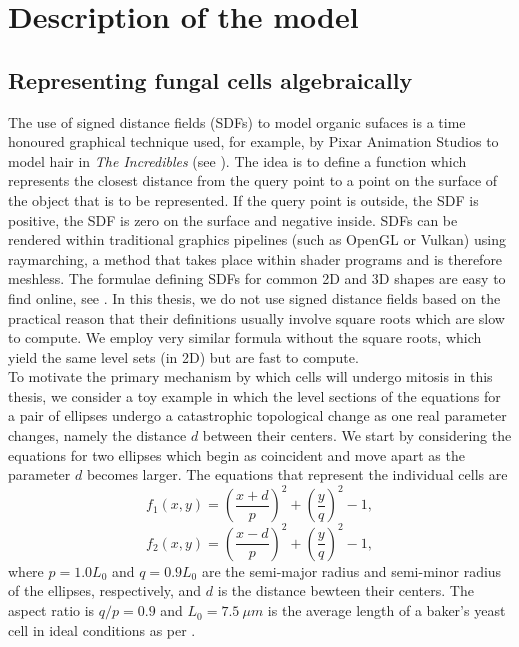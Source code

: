 \chapter{ Description of the model \label{ch:numero_uno}}
\section{Representing fungal cells algebraically}\label{sec:introSDFs}
The use of signed distance fields (SDFs) to model organic sufaces
is a time honoured graphical technique used, for example, by Pixar
Animation Studios to model hair in \textit{The Incredibles} 
(see \cite{petrovic2005volumetric}). The idea is to define a 
function which represents the closest distance from the query point
to a point on the surface of the object that is to be represented. 
If the query point is outside, the SDF is positive,
the SDF is zero on the surface and negative inside. SDFs can be 
rendered within traditional graphics pipelines (such as OpenGL or Vulkan)
using raymarching, a method that takes place within shader programs and 
is therefore meshless. The formulae defining SDFs for common 2D and 3D 
shapes are easy to find online, see \cite{key}. In this thesis,
we do not use signed distance fields based on the practical 
reason that their definitions usually involve square roots
which are slow to compute. We employ very similar formula
without the square roots, which yield the same level sets (in 2D)
but are fast to compute.
\\

To motivate the primary mechanism by which cells will undergo mitosis 
in this thesis, we consider a toy example in which the level sections of the equations for
a pair of ellipses undergo a catastrophic topological change as one real parameter 
changes, namely the distance $d$ between their centers. We start by considering 
the equations for two ellipses which 
begin as coincident and move apart as the parameter $d$ becomes larger. 
The equations that represent the individual cells are
\begin{equation*}
    f_1(x,y) = \left( \frac{x+d}{p} \right)^2 + \left( \frac{y}{q} \right)^2 - 1,
\end{equation*}
\begin{equation*}
    f_2(x,y) = \left( \frac{x-d}{p} \right)^2 + \left( \frac{y}{q} \right)^2 - 1,
\end{equation*}
where $p=1.0 L_0$ and $q=0.9 L_0$ are the semi-major radius and semi-minor radius
of the ellipses, respectively, 
and $d$ is the distance bewteen their centers. The aspect ratio is $q/p = 0.9$ and $L_0 = 7.5 \ \mu m$
is the average length of a baker's yeast cell in ideal conditions as per
\cite{chavez2024cell}.
\\

